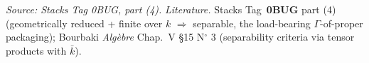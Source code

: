 \begin{remark}
  \textit{Source: Stacks Tag 0BUG, part (4).}
  \emph{Literature.} Stacks Tag~\textbf{0BUG} part (4) (geometrically reduced + finite over \(k\) \(\Rightarrow\) separable, the load-bearing \(\Gamma\)-of-proper packaging); Bourbaki \emph{Alg\`ebre} Chap.~V \S 15 N\(^\circ\) 3 (separability criteria via tensor products with \(\bar k\)).
\end{remark}

